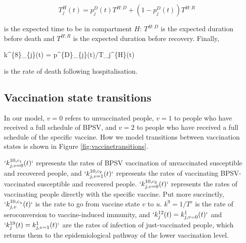 \documentclass[
]{article}
\newenvironment{Shaded}{\begin{snugshade}}{\end{snugshade}}
\newcommand{\NormalTok}[1]{#1}
\begin{document}
\[T_j^{H}(t) = p_j^{D}(t)T^{H:D} + (1-p_{j}^{D}(t))T^{H:R}\]

is the expected time to be in compartment \(H\): \(T^{H:D}\) is the expected duration before death and \(T^{H:R}\) is the expected duration before recovery. Finally,

\begin{Shaded}
\begin{Highlighting}[]
\NormalTok{k\^{}\{8\}\_\{j\}(t) = p\^{}\{D\}\_\{j\}(t)/T\_j\^{}\{H\}(t)}
\end{Highlighting}
\end{Shaded}

is the rate of death following hospitalisation.

\subsection{Vaccination state transitions}\label{vaccination-state-transitions}

In our model, \(v=0\) refers to unvaccinated people, \(v=1\) to people who have received a full schedule of BPSV, and \(v=2\) to people who have received a full schedule of the specific vaccine. How we model transitions between vaccination states is shown in Figure \ref{fig:vaccinetransitions}.

\(`k^{10,c_1}_{j,v=0}(t)`\) represents the rates of BPSV vaccination of unvaccinated susceptible and recovered people, and \(`k^{10,c_2}_{j,v=1}(t)`\) represents the rates of vaccinating BPSV-vaccinated susceptible and recovered people. \(`k^{10,c_2}_{j,v=0}(t)`\) represents the rates of vaccinating people directly with the specific vaccine. Put more succinctly, \(`k^{10,c_u}_{j,v}(t)`\) is the rate to go from vaccine state \(v\) to \(u\). \(k^9=1/T^c\) is the rate of seroconversion to vaccine-induced immunity, and \(`k^{12}_{j}(t)=k^{1}_{j,v=0}(t)`\) and \(`k^{19}_{j}(t)=k^{1}_{j,v=1}(t)`\) are the rates of infection of just-vaccinated people, which returns them to the epidemiological pathway of the lower vaccination level.
\end{document}
